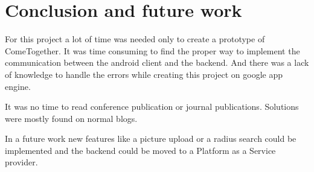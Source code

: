 \section{Conclusion and future work}\label{Conclusion}
For this project a lot of time was needed only to create a prototype of ComeTogether. It was time consuming to find the proper way to implement the communication between the android client and the backend. And there was a lack of knowledge to handle the errors while creating this project on google app engine. 

It was no time to read conference publication or journal publications. Solutions were mostly found on normal blogs.


In a future work new features like a picture upload or a radius search could be implemented and the backend could be moved to a  Platform as a Service provider.